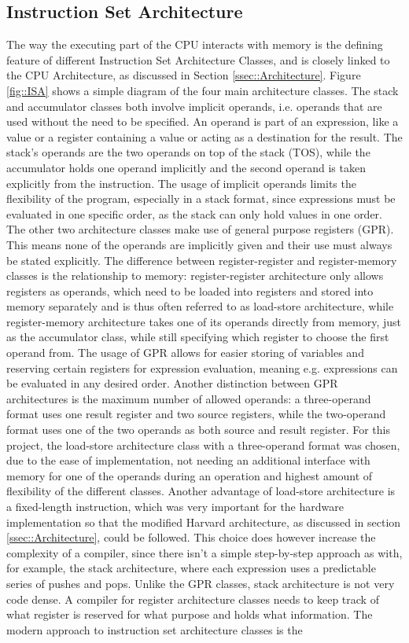 \subsection{Instruction Set Architecture}
The way the executing part of the CPU interacts with memory is the defining feature of different Instruction Set Architecture Classes, and is closely linked to the CPU Architecture, as discussed in Section \ref{ssec::Architecture}. Figure \ref{fig::ISA} shows a simple diagram of the four main architecture classes. The stack and accumulator classes both involve implicit operands, i.e. operands that are used without the need to be specified. An operand is part of an expression, like a value or a register containing a value or acting as a destination for the result. The stack's operands are the two operands on top of the stack (TOS), while the accumulator holds one operand implicitly and the second operand is taken explicitly from the instruction. The usage of implicit operands limits the flexibility of the program, especially in a stack format, since expressions must be evaluated in one specific order, as the stack can only hold values in one order. The other two architecture classes make use of general purpose registers (GPR). This means none of the operands are implicitly given and their use must always be stated explicitly. The difference between register-register and register-memory classes is the relationship to memory: register-register architecture only allows registers as operands, which need to be loaded into registers and stored into memory separately and is thus often referred to as load-store architecture, while register-memory architecture takes one of its operands directly from memory, just as the accumulator class, while still specifying which register to choose the first operand from. The usage of GPR allows for easier storing of variables and reserving certain registers for expression evaluation, meaning e.g. expressions can be evaluated in any desired order. Another distinction between GPR architectures is the maximum number of allowed operands: a three-operand format uses one result register and two source registers, while the two-operand format uses one of the two operands as both source and result register. For this project, the load-store architecture class with a three-operand format was chosen, due to the ease of implementation, not needing an additional interface with memory for one of the operands during an operation and highest amount of flexibility of the different classes. Another advantage of load-store architecture is a fixed-length instruction, which was very important for the hardware implementation so that the modified Harvard architecture, as discussed in section \ref{ssec::Architecture}, could be followed. This choice does however increase the complexity of a compiler, since there isn't a simple step-by-step approach as with, for example, the stack architecture, where each expression uses a predictable series of pushes and pops. Unlike the GPR classes, stack architecture is not very code dense. A compiler for register architecture classes needs to keep track of what register is reserved for what purpose and holds what information. The modern approach to instruction set architecture classes is the 